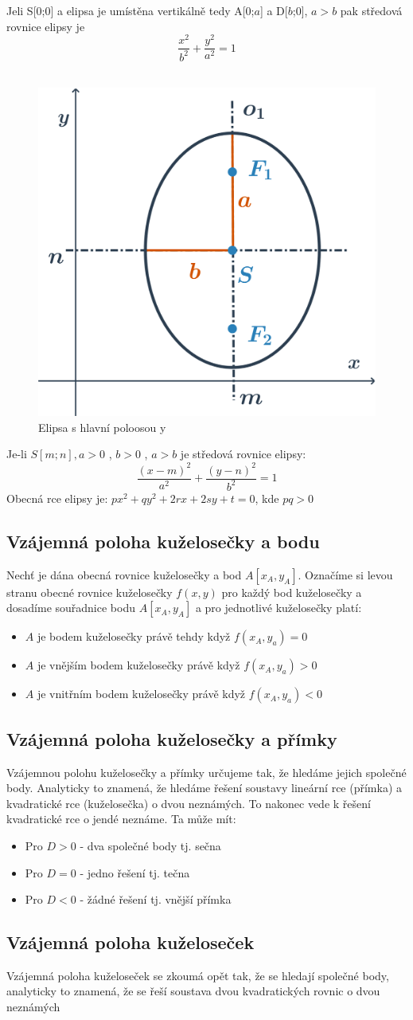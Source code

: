   
    \vspace{1em}
    Jeli S[0;0] a elipsa je umístěna vertikálně tedy A[0;$a$] a D[$b$;0], $a > b$ pak středová rovnice elipsy je  
    $$
    \frac{x^2}{b^2} + \frac{y^2}{a^2}=1
    $$\\
    \vspace{1em} 
    
    \begin{figure}[H]
        \centering
        \includegraphics[width=0.3\linewidth]{img/14_elipsa 2.png}
        \caption{Elipsa s hlavní poloosou y} 
        \label{fig:enter-label}
    \end{figure}
    
    \vspace{1em}
    Je-li $S[m;n], a>0 $ , $ b>0 $ , $ a>b$ je středová rovnice elipsy: 
    $$
    \frac{(x-m)^2}{a^2} + \frac{(y-n)^2}{b^2}=1
    $$ 
    Obecná rce elipsy je: $px^2+qy^2+2rx+2sy+t=0$, kde $pq>0$
\subsection{Vzájemná poloha kuželosečky a bodu}
    Nechť je dána obecná rovnice kuželosečky a bod $A[x_A,y_A]$. Označíme si levou stranu obecné rovnice kuželosečky $f(x,y)$ pro každý bod kuželosečky a dosadíme souřadnice bodu $A[x_A,y_A]$ a pro jednotlivé kuželosečky platí: \begin{itemize}
        \item $A$ je bodem kuželosečky právě tehdy když $f(x_A,y_a)=0$
        \item $A$ je vnějším bodem kuželosečky právě když $f(x_A,y_a)>0$
        \item $A$ je vnitřním bodem kuželosečky právě když $f(x_A,y_a)<0$
    \end{itemize}
\subsection{Vzájemná poloha kuželosečky a přímky}
    Vzájemnou polohu kuželosečky a přímky určujeme tak, že hledáme jejich společné body. Analyticky to znamená, že hledáme řešení soustavy lineární rce (přímka) a kvadratické rce (kuželosečka) o dvou neznámých. To nakonec vede k řešení kvadratické rce o jendé neznáme. Ta může mít: \begin{itemize}
        \item Pro $D>0$ - dva společné body tj. sečna
        \item Pro $D=0$ - jedno řešení tj. tečna
        \item Pro $D<0$ - žádné řešení tj. vnější přímka
    \end{itemize}
\subsection{Vzájemná poloha kuželoseček}
    Vzájemná poloha kuželoseček se zkoumá opět tak, že se hledají společné body, analyticky to znamená, že se řeší soustava dvou kvadratických rovnic o dvou neznámých
